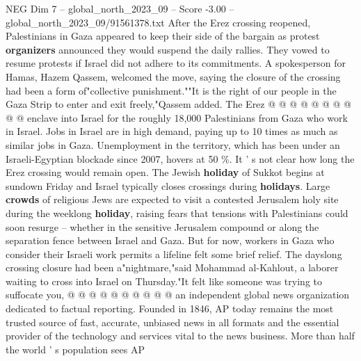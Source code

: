 \begin{textsample}{NEG Dim 7 – global\_north\_2023\_09 – Score -3.00 – global\_north\_2023\_09/91561378.txt}
After the Erez crossing reopened, Palestinians in Gaza appeared to keep their side of the bargain as protest \textbf{organizers} announced they would suspend the daily rallies.
They vowed to resume protests if Israel did not adhere to its commitments.
A spokesperson for Hamas, Hazem Qassem, welcomed the move, saying the closure of the crossing had been a form of"collective punishment.""It is the right of our people in the Gaza Strip to enter and exit freely,"Qassem added.
The Erez @ @ @ @ @ @ @ @ @ @ enclave into Israel for the roughly 18,000 Palestinians from Gaza who work in Israel.
Jobs in Israel are in high demand, paying up to 10 times as much as similar jobs in Gaza.
Unemployment in the territory, which has been under an Israeli-Egyptian blockade since 2007, hovers at 50 \%.
It ' s not clear how long the Erez crossing would remain open.
The Jewish \textbf{holiday} of Sukkot begins at sundown Friday and Israel typically closes crossings during \textbf{holidays}.
Large \textbf{crowds} of religious Jews are expected to visit a contested Jerusalem holy site during the weeklong \textbf{holiday}, raising fears that tensions with Palestinians could soon resurge -- whether in the sensitive Jerusalem compound or along the separation fence between Israel and Gaza.
But for now, workers in Gaza who consider their Israeli work permits a lifeline felt some brief relief.
The dayslong crossing closure had been a"nightmare,"said Mohammad al-Kahlout, a laborer waiting to cross into Israel on Thursday."It felt like someone was trying to suffocate you, @ @ @ @ @ @ @ @ @ @ an independent global news organization dedicated to factual reporting.
Founded in 1846, AP today remains the most trusted source of fast, accurate, unbiased news in all formats and the essential provider of the technology and services vital to the news business.
More than half the world ' s population sees AP

\end{textsample}
